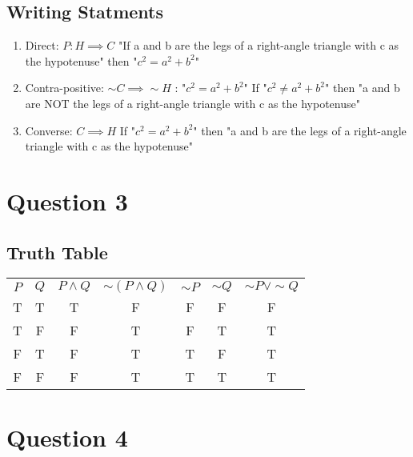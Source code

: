 \documentclass[11pt]{article}
\theoremstyle{plain}
\begin{document}
\subsection{Writing Statments}

\begin{enumerate}
    \item Direct: $P: H \implies C$
        \subitem "If a and b are the legs of a right-angle triangle with c as the hypotenuse" then "$c^2 = a^2 + b^2$"
    \item Contra-positive: $\sim C \implies \sim H$ : "$c^2 = a^2 + b^2$"
        \subitem If "$c^2 \neq a^2 + b^2$" then "a and b are NOT the legs of a right-angle triangle with c as the hypotenuse"
    \item Converse: $C \implies H$
        \subitem If "$c^2 = a^2 + b^2$" then "a and b are the legs of a right-angle triangle with c as the hypotenuse"
\end {enumerate}


\section*{Question 3}


\subsection{Truth Table}
\begin{center}
\begin{tabular}{ c c c c c c c }
    $P$ & $Q$ & $P \land Q$ & $\sim (P \land Q)$ & $\sim P$ & $\sim Q$ & $\sim P \lor \sim Q$\\
    T & T & T & F &F & F & F\\ 
    T & F & F & T &F & T & T\\
    F & T & F & T &T & F & T\\
    F & F & F & T &T & T & T\\
\end{tabular}
\end{center}


\section*{Question 4}
\end{document}
